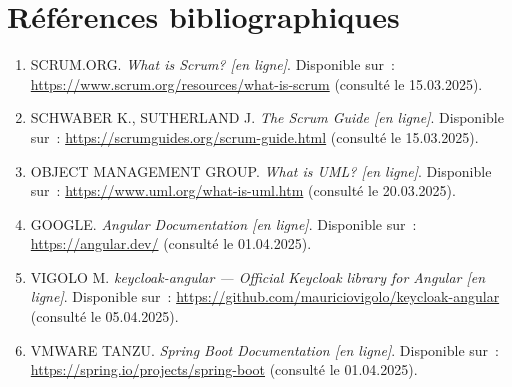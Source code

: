 
\chapter*{Références bibliographiques}

\begin{enumerate}

  \item SCRUM.ORG.
        \textit{What is Scrum? [en ligne]}.
        Disponible sur~: \url{https://www.scrum.org/resources/what-is-scrum}
        (consulté le 15.03.2025).

  \item SCHWABER K., SUTHERLAND J.
        \textit{The Scrum Guide [en ligne]}.
        Disponible sur~: \url{https://scrumguides.org/scrum-guide.html}
        (consulté le 15.03.2025).

  \item OBJECT MANAGEMENT GROUP.
        \textit{What is UML? [en ligne]}.
        Disponible sur~: \url{https://www.uml.org/what-is-uml.htm}
        (consulté le 20.03.2025).

  \item GOOGLE.
        \textit{Angular Documentation [en ligne]}.
        Disponible sur~: \url{https://angular.dev/}
        (consulté le 01.04.2025).

  \item VIGOLO M.
        \textit{keycloak-angular — Official Keycloak library for Angular [en ligne]}.
        Disponible sur~: \url{https://github.com/mauriciovigolo/keycloak-angular}
        (consulté le 05.04.2025).

  \item VMWARE TANZU.
        \textit{Spring Boot Documentation [en ligne]}.
        Disponible sur~: \url{https://spring.io/projects/spring-boot}
        (consulté le 01.04.2025).


\end{enumerate}

